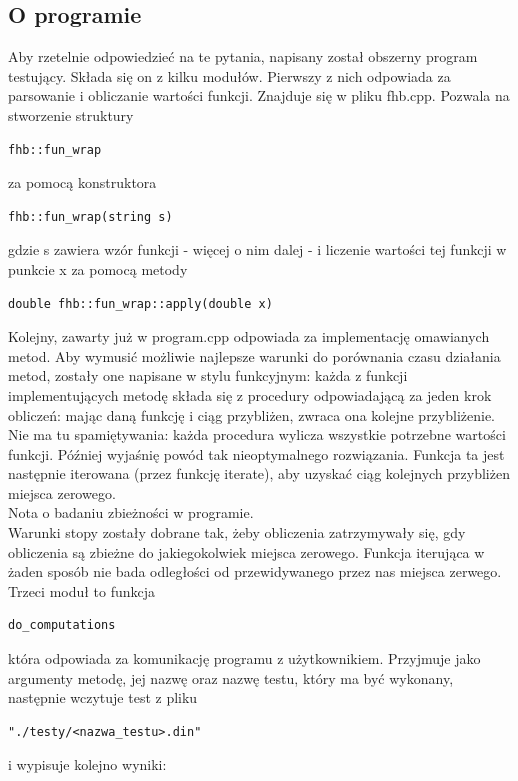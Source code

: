 \documentclass[11pt,wide]{mwart}
\begin{document}
\subsection{O programie}
Aby rzetelnie odpowiedzieć na te pytania, napisany został obszerny program testujący. Składa się on z kilku modułów.
Pierwszy z nich odpowiada za parsowanie i obliczanie wartości funkcji. 
Znajduje się w pliku fhb.cpp.
Pozwala na stworzenie struktury \begin{verbatim}fhb::fun_wrap\end{verbatim} za pomocą konstruktora \begin{verbatim}fhb::fun_wrap(string s)\end{verbatim} gdzie s zawiera wzór funkcji - więcej o nim dalej - i liczenie wartości tej funkcji w punkcie x za pomocą metody \begin{verbatim}double fhb::fun_wrap::apply(double x)\end{verbatim}
Kolejny, zawarty już w program.cpp odpowiada za implementację omawianych metod.
Aby wymusić możliwie najlepsze warunki do porównania czasu działania metod, zostały one napisane w stylu funkcyjnym: każda z funkcji implementujących metodę składa się z procedury odpowiadającą za jeden krok obliczeń: mając daną funkcję i ciąg przybliżen, zwraca ona kolejne przybliżenie.
Nie ma tu spamiętywania: każda procedura wylicza wszystkie potrzebne wartości funkcji. Później wyjaśnię powód tak nieoptymalnego rozwiązania.
Funkcja ta jest następnie iterowana (przez funkcję iterate), aby uzyskać ciąg kolejnych przybliżen miejsca zerowego.\\
{\small{Nota o badaniu zbieżności w programie.\\ Warunki stopy zostały dobrane tak, żeby obliczenia zatrzymywały się, gdy obliczenia są zbieżne do jakiegokolwiek miejsca zerowego. Funkcja iterująca w żaden sposób nie bada odległości od przewidywanego przez nas miejsca zerwego.}}
\\Trzeci moduł to funkcja \begin{verbatim}do_computations\end{verbatim} która odpowiada za komunikację programu z użytkownikiem.
Przyjmuje jako argumenty metodę, jej nazwę oraz nazwę testu, który ma być wykonany, następnie wczytuje test z pliku \begin{verbatim}"./testy/<nazwa_testu>.din"\end{verbatim} i wypisuje kolejno wyniki:\\
\end{document}
